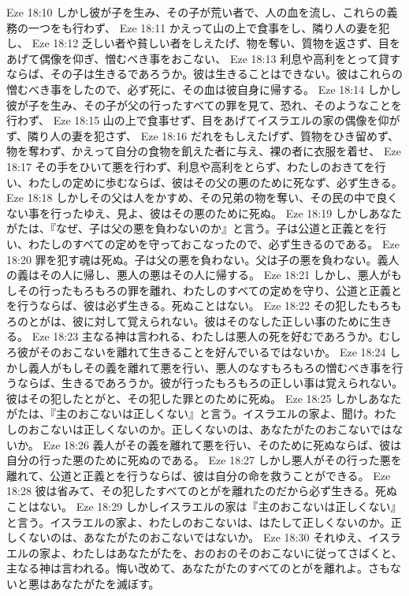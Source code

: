 Eze 18:10  しかし彼が子を生み、その子が荒い者で、人の血を流し、これらの義務の一つをも行わず、
Eze 18:11  かえって山の上で食事をし、隣り人の妻を犯し、
Eze 18:12  乏しい者や貧しい者をしえたげ、物を奪い、質物を返さず、目をあげて偶像を仰ぎ、憎むべき事をおこない、
Eze 18:13  利息や高利をとって貸すならば、その子は生きるであろうか。彼は生きることはできない。彼はこれらの憎むべき事をしたので、必ず死に、その血は彼自身に帰する。
Eze 18:14  しかし彼が子を生み、その子が父の行ったすべての罪を見て、恐れ、そのようなことを行わず、
Eze 18:15  山の上で食事せず、目をあげてイスラエルの家の偶像を仰がず、隣り人の妻を犯さず、
Eze 18:16  だれをもしえたげず、質物をひき留めず、物を奪わず、かえって自分の食物を飢えた者に与え、裸の者に衣服を着せ、
Eze 18:17  その手をひいて悪を行わず、利息や高利をとらず、わたしのおきてを行い、わたしの定めに歩むならば、彼はその父の悪のために死なず、必ず生きる。
Eze 18:18  しかしその父は人をかすめ、その兄弟の物を奪い、その民の中で良くない事を行ったゆえ、見よ、彼はその悪のために死ぬ。
Eze 18:19  しかしあなたがたは、『なぜ、子は父の悪を負わないのか』と言う。子は公道と正義とを行い、わたしのすべての定めを守っておこなったので、必ず生きるのである。
Eze 18:20  罪を犯す魂は死ぬ。子は父の悪を負わない。父は子の悪を負わない。義人の義はその人に帰し、悪人の悪はその人に帰する。
Eze 18:21  しかし、悪人がもしその行ったもろもろの罪を離れ、わたしのすべての定めを守り、公道と正義とを行うならば、彼は必ず生きる。死ぬことはない。
Eze 18:22  その犯したもろもろのとがは、彼に対して覚えられない。彼はそのなした正しい事のために生きる。
Eze 18:23  主なる神は言われる、わたしは悪人の死を好むであろうか。むしろ彼がそのおこないを離れて生きることを好んでいるではないか。
Eze 18:24  しかし義人がもしその義を離れて悪を行い、悪人のなすもろもろの憎むべき事を行うならば、生きるであろうか。彼が行ったもろもろの正しい事は覚えられない。彼はその犯したとがと、その犯した罪とのために死ぬ。
Eze 18:25  しかしあなたがたは、『主のおこないは正しくない』と言う。イスラエルの家よ、聞け。わたしのおこないは正しくないのか。正しくないのは、あなたがたのおこないではないか。
Eze 18:26  義人がその義を離れて悪を行い、そのために死ぬならば、彼は自分の行った悪のために死ぬのである。
Eze 18:27  しかし悪人がその行った悪を離れて、公道と正義とを行うならば、彼は自分の命を救うことができる。
Eze 18:28  彼は省みて、その犯したすべてのとがを離れたのだから必ず生きる。死ぬことはない。
Eze 18:29  しかしイスラエルの家は『主のおこないは正しくない』と言う。イスラエルの家よ、わたしのおこないは、はたして正しくないのか。正しくないのは、あなたがたのおこないではないか。
Eze 18:30  それゆえ、イスラエルの家よ、わたしはあなたがたを、おのおのそのおこないに従ってさばくと、主なる神は言われる。悔い改めて、あなたがたのすべてのとがを離れよ。さもないと悪はあなたがたを滅ぼす。
